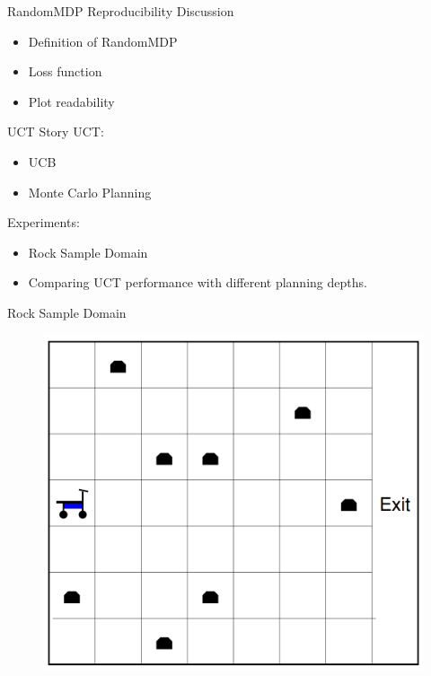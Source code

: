 \documentclass{beamer}
\begin{document}
\begin{frame}{RandomMDP Reproducibility Discussion}
\begin{itemize}\setlength\itemsep{1em}
\item Definition of RandomMDP
\item Loss function 
\item Plot readability 
\end{itemize}
\end{frame}


\begin{frame}{UCT Story}
UCT: 
\begin{itemize}
\item UCB
\item Monte Carlo Planning
\end{itemize}

Experiments:
\begin{itemize}
\item Rock Sample Domain
\item Comparing UCT performance with different planning depths.
\end{itemize}
\end{frame}

\begin{frame}{Rock Sample Domain}

\begin{figure}
\includegraphics[page=1,height=.55\textheight,width=.5\textwidth]{rock_sample_domain.png}
\end{figure}


\end{frame}
\end{document}
